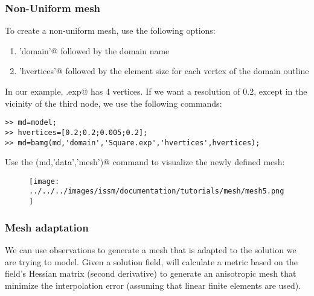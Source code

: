 \subsubsection{Non-Uniform mesh}%
To create a non-uniform mesh, use the following options:
\begin{enumerate}
	\item \verb@'domain'@ followed by the domain name
	\item \verb@'hvertices'@ followed by the element size for each vertex of the domain outline
\end{enumerate}
In our example, \verb@Square.exp@ has 4 vertices. If we want a resolution of 0.2, except in the vicinity of the third node, we use the following commands:
\begin{verbatim}>> md=model;
>> hvertices=[0.2;0.2;0.005;0.2];
>> md=bamg(md,'domain','Square.exp','hvertices',hvertices);
\end{verbatim}
Use the \verb@plotmodel(md,'data','mesh')@ command to visualize the newly defined mesh:
\begin{figure}[H]
	\begin{center}
		\texttt{[image: ../../../images/issm/documentation/tutorials/mesh/mesh5.png]}
	\end{center}
\end{figure}
\subsubsection{Mesh adaptation}%
We can use observations to generate a mesh that is adapted to the solution we are trying to model. Given a solution field, \verb@bamg@ will calculate a metric based on the field's Hessian matrix (second derivative) to generate an anisotropic mesh that minimize the interpolation error (assuming that linear finite elements are used).


